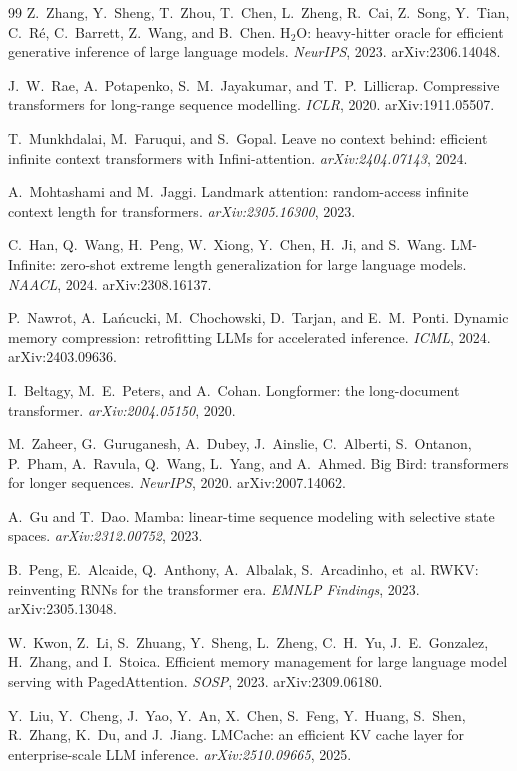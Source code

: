 \documentclass[11pt]{article}
\begin{document}
\begin{thebibliography}{99}
Z.~Zhang, Y.~Sheng, T.~Zhou, T.~Chen, L.~Zheng, R.~Cai, Z.~Song,
Y.~Tian, C.~R\'e, C.~Barrett, Z.~Wang, and B.~Chen.
H$_2$O: heavy-hitter oracle for efficient generative inference of
large language models.
\emph{NeurIPS}, 2023. arXiv:2306.14048.

J.~W.~Rae, A.~Potapenko, S.~M.~Jayakumar, and T.~P.~Lillicrap.
Compressive transformers for long-range sequence modelling.
\emph{ICLR}, 2020. arXiv:1911.05507.

T.~Munkhdalai, M.~Faruqui, and S.~Gopal.
Leave no context behind: efficient infinite context transformers
with Infini-attention.
\emph{arXiv:2404.07143}, 2024.

A.~Mohtashami and M.~Jaggi.
Landmark attention: random-access infinite context length for
transformers.
\emph{arXiv:2305.16300}, 2023.

C.~Han, Q.~Wang, H.~Peng, W.~Xiong, Y.~Chen, H.~Ji, and S.~Wang.
LM-Infinite: zero-shot extreme length generalization for large
language models.
\emph{NAACL}, 2024. arXiv:2308.16137.

P.~Nawrot, A.~La\'ncucki, M.~Chochowski, D.~Tarjan, and
E.~M.~Ponti.
Dynamic memory compression: retrofitting LLMs for accelerated
inference.
\emph{ICML}, 2024. arXiv:2403.09636.

I.~Beltagy, M.~E.~Peters, and A.~Cohan.
Longformer: the long-document transformer.
\emph{arXiv:2004.05150}, 2020.

M.~Zaheer, G.~Guruganesh, A.~Dubey, J.~Ainslie, C.~Alberti,
S.~Ontanon, P.~Pham, A.~Ravula, Q.~Wang, L.~Yang, and
A.~Ahmed.
Big Bird: transformers for longer sequences.
\emph{NeurIPS}, 2020. arXiv:2007.14062.

A.~Gu and T.~Dao.
Mamba: linear-time sequence modeling with selective state spaces.
\emph{arXiv:2312.00752}, 2023.

B.~Peng, E.~Alcaide, Q.~Anthony, A.~Albalak, S.~Arcadinho, et~al.
RWKV: reinventing RNNs for the transformer era.
\emph{EMNLP Findings}, 2023. arXiv:2305.13048.

W.~Kwon, Z.~Li, S.~Zhuang, Y.~Sheng, L.~Zheng, C.~H.~Yu,
J.~E.~Gonzalez, H.~Zhang, and I.~Stoica.
Efficient memory management for large language model serving with
PagedAttention.
\emph{SOSP}, 2023. arXiv:2309.06180.

Y.~Liu, Y.~Cheng, J.~Yao, Y.~An, X.~Chen, S.~Feng, Y.~Huang,
S.~Shen, R.~Zhang, K.~Du, and J.~Jiang.
LMCache: an efficient KV cache layer for enterprise-scale LLM
inference.
\emph{arXiv:2510.09665}, 2025.


\end{thebibliography}
\end{document}
